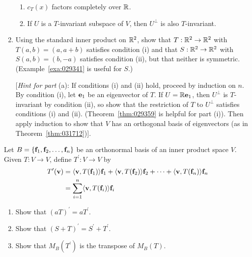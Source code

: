 \begin{multicols}{2}
\begin{ex}
\begin{enumerate}[label={\alph*.}]
\begin{enumerate}[label={\roman*.}]
\item $c_{T}(x)$ factors completely over $\mathbb{R}$.

\item If $U$ is a $T$-invariant subspace of $V$, then $U^{\perp}$ is also $T$-invariant.

\end{enumerate}

\item Using the standard inner product on $\mathbb{R}^2$, show that $T : \mathbb{R}^2 \to \mathbb{R}^2$ with $T(a, b) = (a, a + b)$ satisfies condition (i) and that $S : \mathbb{R}^2 \to \mathbb{R}^2$ with \\ $S(a, b) = (b, -a)$ satisfies condition (ii), but that neither is symmetric. (Example~\ref{exa:029341} is useful for $S$.)

[\textit{Hint for part} (a): If conditions (i) and (ii) hold, proceed by induction on $n$. By condition (i), let $\textbf{e}_{1}$ be an eigenvector of $T$. If $U = \mathbb{R}\textbf{e}_{1}$, then $U^{\perp}$ is $T$-invariant by condition (ii), so show that the restriction of $T$ to $U^{\perp}$ satisfies conditions (i) and (ii). (Theorem~\ref{thm:029359} is helpful for part (i)). Then apply induction to show that $V$ has an orthogonal basis of eigenvectors (as in Theorem~\ref{thm:031712})].

\end{enumerate}
\end{ex}

\begin{ex}
Let $B = \{\textbf{f}_{1}, \textbf{f}_{2}, \dots, \textbf{f}_{n}\}$ be an orthonormal basis of an inner product space $V$. Given $T : V \to V$, define $T^\prime : V \to V$ by 
\begin{align*}
T^\prime(\textbf{v}) & = \langle \textbf{v}, T(\textbf{f}_1) \rangle \textbf{f}_1 + 
\langle \textbf{v}, T(\textbf{f}_2) \rangle \textbf{f}_2 + \dots +
\langle \textbf{v}, T(\textbf{f}_n) \rangle \textbf{f}_n \\
& = \displaystyle \sum_{i = 1}^{n} \langle \textbf{v}, T(\textbf{f}_i) \rangle \textbf{f}_i
\end{align*}

\begin{enumerate}[label={\alph*.}]
\item Show that $(aT)^\prime = aT^\prime$.

\item Show that $(S + T)^\prime = S^\prime + T^\prime$.

\item Show that $M_{B}(T^\prime)$ is the transpose of $M_{B}(T)$.


\end{enumerate}
\end{ex}
\end{multicols}
